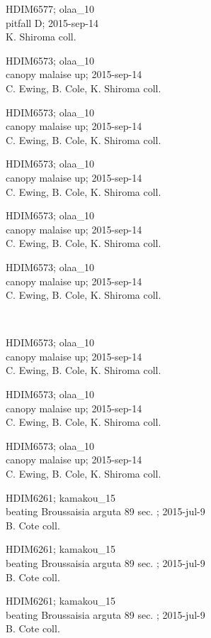 \documentclass[2pt]{extarticle}
\begin{document}
\noindent
\parbox{0.16\textwidth}{\tiny \raggedright \rule[-0.3\baselineskip]{0pt}{10pt}HDIM6577; olaa\_10\\ pitfall D; 2015-sep-14\\ K. Shiroma coll.}
\parbox{0.16\textwidth}{\tiny \raggedright \rule[-0.3\baselineskip]{0pt}{10pt}HDIM6573; olaa\_10\\ canopy malaise up; 2015-sep-14\\ C. Ewing, B. Cole, K. Shiroma coll.}
\parbox{0.16\textwidth}{\tiny \raggedright \rule[-0.3\baselineskip]{0pt}{10pt}HDIM6573; olaa\_10\\ canopy malaise up; 2015-sep-14\\ C. Ewing, B. Cole, K. Shiroma coll.}
\parbox{0.16\textwidth}{\tiny \raggedright \rule[-0.3\baselineskip]{0pt}{10pt}HDIM6573; olaa\_10\\ canopy malaise up; 2015-sep-14\\ C. Ewing, B. Cole, K. Shiroma coll.}
\parbox{0.16\textwidth}{\tiny \raggedright \rule[-0.3\baselineskip]{0pt}{10pt}HDIM6573; olaa\_10\\ canopy malaise up; 2015-sep-14\\ C. Ewing, B. Cole, K. Shiroma coll.}
\parbox{0.16\textwidth}{\tiny \raggedright \rule[-0.3\baselineskip]{0pt}{10pt}HDIM6573; olaa\_10\\ canopy malaise up; 2015-sep-14\\ C. Ewing, B. Cole, K. Shiroma coll.} \\ 
\vspace{0.001in} 

\noindent
\parbox{0.16\textwidth}{\tiny \raggedright \rule[-0.3\baselineskip]{0pt}{10pt}HDIM6573; olaa\_10\\ canopy malaise up; 2015-sep-14\\ C. Ewing, B. Cole, K. Shiroma coll.}
\parbox{0.16\textwidth}{\tiny \raggedright \rule[-0.3\baselineskip]{0pt}{10pt}HDIM6573; olaa\_10\\ canopy malaise up; 2015-sep-14\\ C. Ewing, B. Cole, K. Shiroma coll.}
\parbox{0.16\textwidth}{\tiny \raggedright \rule[-0.3\baselineskip]{0pt}{10pt}HDIM6573; olaa\_10\\ canopy malaise up; 2015-sep-14\\ C. Ewing, B. Cole, K. Shiroma coll.}
\parbox{0.16\textwidth}{\tiny \raggedright \rule[-0.3\baselineskip]{0pt}{10pt}HDIM6261; kamakou\_15\\ beating Broussaisia arguta 89 sec. ; 2015-jul-9\\ B. Cote coll.}
\parbox{0.16\textwidth}{\tiny \raggedright \rule[-0.3\baselineskip]{0pt}{10pt}HDIM6261; kamakou\_15\\ beating Broussaisia arguta 89 sec. ; 2015-jul-9\\ B. Cote coll.}
\parbox{0.16\textwidth}{\tiny \raggedright \rule[-0.3\baselineskip]{0pt}{10pt}HDIM6261; kamakou\_15\\ beating Broussaisia arguta 89 sec. ; 2015-jul-9\\ B. Cote coll.} \\ 
\vspace{0.001in} 
\end{document}
